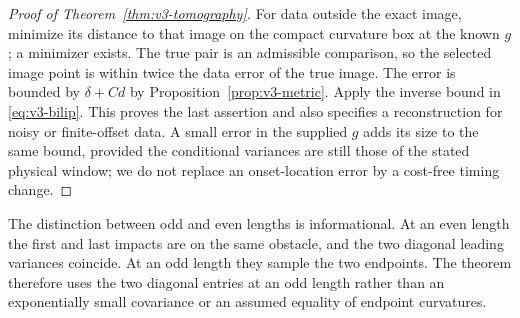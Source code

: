\begin{proof}[Proof of Theorem~\ref{thm:v3-tomography}]
For data outside the exact image, minimize its distance to that image
on the compact curvature box at the known $g$; a minimizer exists.
The true pair is an admissible comparison, so the selected image point
is within twice the data error of the true image. The error is bounded
by $\delta+Cd$ by Proposition~\ref{prop:v3-metric}. Apply the inverse
bound in \eqref{eq:v3-bilip}. This proves the last assertion and also
specifies a reconstruction for noisy or finite-offset data. A small
error in the supplied $g$ adds its size to the same bound, provided the
conditional variances are still those of the stated physical window;
we do not replace an onset-location error by a cost-free timing change.
\end{proof}

The distinction between odd and even lengths is informational. At an
even length the first and last impacts are on the same obstacle, and
the two diagonal leading variances coincide. At an odd length they
sample the two endpoints. The theorem therefore uses the two diagonal
entries at an odd length rather than an exponentially small covariance
or an assumed equality of endpoint curvatures.

